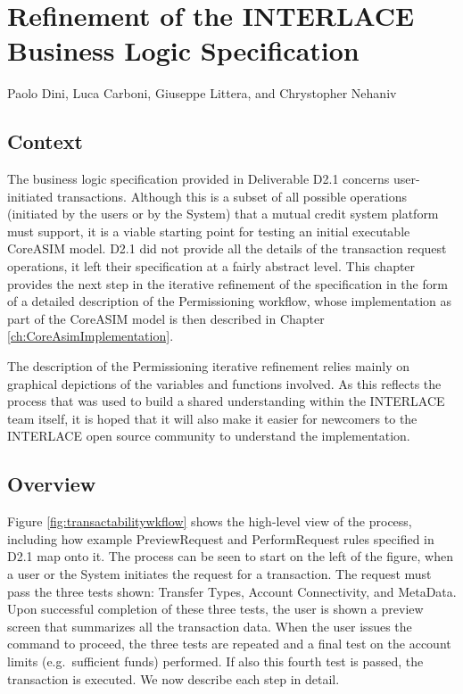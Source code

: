 \chapter{Refinement of the INTERLACE Business Logic Specification}
\label{ch:UpdateBLS}

\vspace{-1cm}
\begin{center}
Paolo Dini, Luca Carboni, Giuseppe Littera, and Chrystopher Nehaniv
\end{center}

\section{Context}
The business logic specification provided in Deliverable D2.1 \cite{INTERLACE_D21} concerns user-initiated transactions. Although this is a subset of all possible operations (initiated by the users or by the System) that a mutual credit system platform must support, it is a viable starting point for testing an initial executable CoreASIM model. D2.1 did not provide all the details of the transaction request operations, it left their specification at a fairly abstract level. This chapter provides the next step in the iterative refinement of the specification in the form of a detailed description of the Permissioning workflow, whose implementation as part of the CoreASIM model is then described in Chapter \ref{ch:CoreAsimImplementation}.

The description of the Permissioning iterative refinement relies mainly on graphical depictions of the variables and functions involved. As this reflects the process that was used to build a shared understanding within the INTERLACE team itself, it is hoped that it will also make it easier for newcomers to the INTERLACE open source community to understand the implementation.

\section{Overview}
Figure \ref{fig:transactabilitywkflow} shows the high-level view of the process, including how example PreviewRequest and PerformRequest rules specified in D2.1 map onto it. The process can be seen to start on the left of the figure, when a user or the System initiates the request for a transaction. The request must pass the three tests shown: Transfer Types, Account Connectivity, and MetaData. Upon successful completion of these three tests, the user is shown a preview screen that summarizes all the transaction data. When the user issues the command to proceed, the three tests are repeated and a final test on the account limits (e.g.\ sufficient funds) performed. If also this fourth test is passed, the transaction is executed. We now describe each step in detail.

